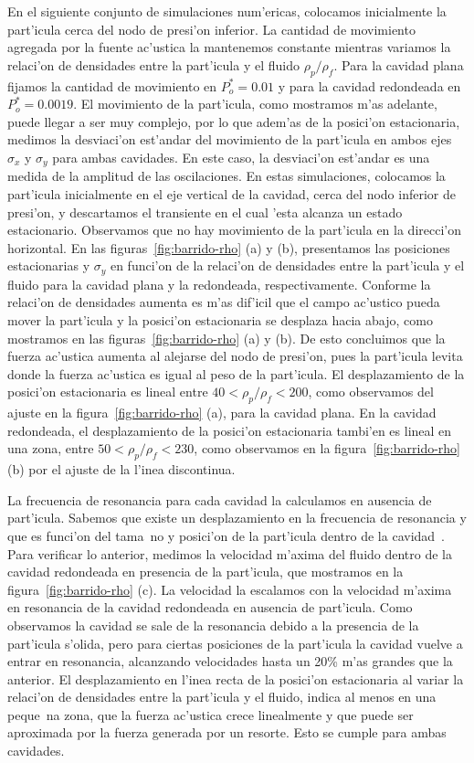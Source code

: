 En el siguiente conjunto de simulaciones num'ericas,   colocamos inicialmente la part'icula
cerca del nodo de presi'on inferior. La cantidad de movimiento agregada por la fuente ac'ustica
la  mantenemos constante mientras variamos la relaci'on de densidades entre la part'icula y el fluido $\rho_p/\rho_f$.
Para la cavidad plana fijamos la cantidad de movimiento 
en $P_o^\ast=0.01$ y para la cavidad redondeada en $P_o^\ast=0.0019$.
El movimiento de la part'icula, como mostramos m'as adelante, puede llegar a ser 
muy complejo, por lo que adem'as de la posici'on estacionaria, medimos la desviaci'on est'andar 
del movimiento de la part'icula en ambos ejes $\sigma_x$ y $\sigma_y$  para ambas cavidades. En este
caso, la desviaci'on est'andar es una medida de la amplitud de las oscilaciones.
En estas simulaciones, colocamos la part'icula  inicialmente en el eje vertical de la cavidad, cerca 
del nodo inferior de presi'on, y descartamos el transiente en el cual 'esta alcanza un estado
estacionario. Observamos que no hay movimiento de la part'icula en la direcci'on horizontal.
En las figuras~\ref{fig:barrido-rho} (a) y (b), presentamos las posiciones estacionarias y 
$\sigma_y$ en funci'on de la relaci'on de densidades entre la part'icula y el fluido para la cavidad
plana y la redondeada, respectivamente. Conforme
la relaci'on de densidades aumenta es m'as dif'icil que el campo ac'ustico pueda mover la part'icula
y  la posici'on estacionaria se desplaza hacia abajo, como 
mostramos en las figuras~\ref{fig:barrido-rho} (a) y (b). De esto concluimos que la fuerza
ac'ustica aumenta al alejarse del nodo de presi'on, pues la part'icula levita donde la fuerza ac'ustica
es igual al peso de la part'icula. El desplazamiento de la posici'on
estacionaria es lineal entre $40< \rho_p/\rho_f < 200$, como observamos
del ajuste en la figura~\ref{fig:barrido-rho} (a), para la cavidad plana.
En la cavidad redondeada, el desplazamiento de la posici'on estacionaria tambi'en es lineal
en una zona, entre $50<\rho_p/\rho_f < 230$, como observamos 
en la figura~\ref{fig:barrido-rho} (b) por el ajuste de la l'inea discontinua.


La frecuencia de resonancia para cada cavidad la calculamos en ausencia de part'icula. Sabemos
que existe un desplazamiento en la frecuencia de resonancia y que es funci'on del tama~no 
y posici'on de la part'icula dentro de la cavidad~\cite{leung82}. 
Para verificar lo anterior, medimos la velocidad m'axima del fluido dentro de la cavidad
redondeada en presencia de la part'icula, que mostramos en la figura~\ref{fig:barrido-rho} (c). La velocidad
la escalamos con la velocidad m'axima en resonancia de la cavidad redondeada en ausencia de part'icula. Como 
observamos la cavidad se sale de la resonancia debido a la presencia de la part'icula s'olida, pero para
ciertas posiciones de la part'icula la cavidad vuelve a entrar en resonancia, alcanzando velocidades
hasta un 20\% m'as grandes que la anterior.
El desplazamiento en l'inea recta de la posici'on estacionaria al variar la relaci'on
de densidades entre la part'icula y el fluido, indica al menos en una peque~na zona,
que la fuerza ac'ustica crece linealmente y que puede ser aproximada por la fuerza
generada por un resorte. Esto se cumple para ambas cavidades.



